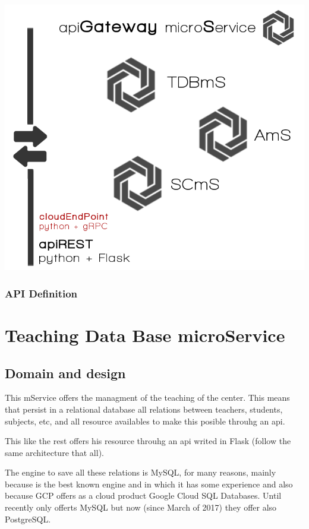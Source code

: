 \begin{center}
\includegraphics[scale=0.35]{img/graphics/apigateway.png}
\end{center}

\subsubsection {API Definition}






\section{Teaching Data Base microService}

\subsection{Domain and design}

This mService offers the managment of the teaching of the center.
This means that persist in a relational database all relations between
teachers, students, subjects, etc, and all resource availables to
make this posible throuhg an api.\bigskip

This like the rest offers his resource throuhg an api writed in Flask
(follow the same architecture that all).

The engine to save all these relations is MySQL, for many reasons,
mainly because is the best known engine and in which it has some experience
and also because GCP offers as a cloud product Google Cloud SQL Databases.
Until recently only offerts MySQL but now (since March of 2017) they
offer also PostgreSQL.

